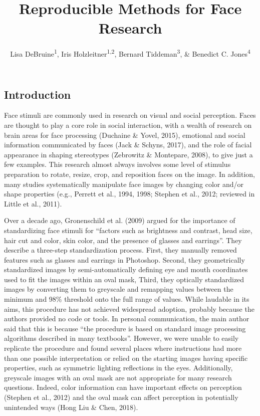 \documentclass[
  doc,floatsintext]{apa6}
\title{Reproducible Methods for Face Research}
\author{Lisa DeBruine\textsuperscript{1}, Iris Holzleitner\textsuperscript{1,2}, Bernard Tiddeman\textsuperscript{3}, \& Benedict C. Jones\textsuperscript{4}}
\date{}
\affiliation{\vspace{0.5cm}\textsuperscript{1} Institute of Neuroscience \& Psychology, University of Glasgow\\\textsuperscript{2} Health and Social Sciences, University of the West of England, Bristol\\\textsuperscript{3} Computer Science, Aberystwyth University\\\textsuperscript{4} Psychological Sciences \& Health, University of Strathclyde}
\begin{document}
\maketitle

\hypertarget{introduction}{%
\subsection{Introduction}\label{introduction}}

Face stimuli are commonly used in research on visual and social perception. Faces are thought to play a core role in social interaction, with a wealth of research on brain areas for face processing (Duchaine \& Yovel, 2015), emotional and social information communicated by faces (Jack \& Schyns, 2017), and the role of facial appearance in shaping stereotypes (Zebrowitz \& Montepare, 2008), to give just a few examples. This research almost always involves some level of stimulus preparation to rotate, resize, crop, and reposition faces on the image. In addition, many studies systematically manipulate face images by changing color and/or shape properties (e.g., Perrett et al., 1994, 1998; Stephen et al., 2012; reviewed in Little et al., 2011).

Over a decade ago, Gronenschild et al. (2009) argued for the importance of standardizing face stimuli for ``factors such as brightness and contrast, head size, hair cut and color, skin color, and the presence of glasses and earrings''. They describe a three-step standardization process. First, they manually removed features such as glasses and earrings in Photoshop. Second, they geometrically standardized images by semi-automatically defining eye and mouth coordinates used to fit the images within an oval mask, Third, they optically standardized images by converting them to greyscale and remapping values between the minimum and 98\% threshold onto the full range of values. While laudable in its aims, this procedure has not achieved widespread adoption, probably because the authors provided no code or tools. In personal communication, the main author said that this is because ``the procedure is based on standard image processing algorithms described in many textbooks''. However, we were unable to easily replicate the procedure and found several places where instructions had more than one possible interpretation or relied on the starting images having specific properties, such as symmetric lighting reflections in the eyes. Additionally, greyscale images with an oval mask are not appropriate for many research questions. Indeed, color information can have important effects on perception (Stephen et al., 2012) and the oval mask can affect perception in potentially unintended ways (Hong Liu \& Chen, 2018).
\end{document}
